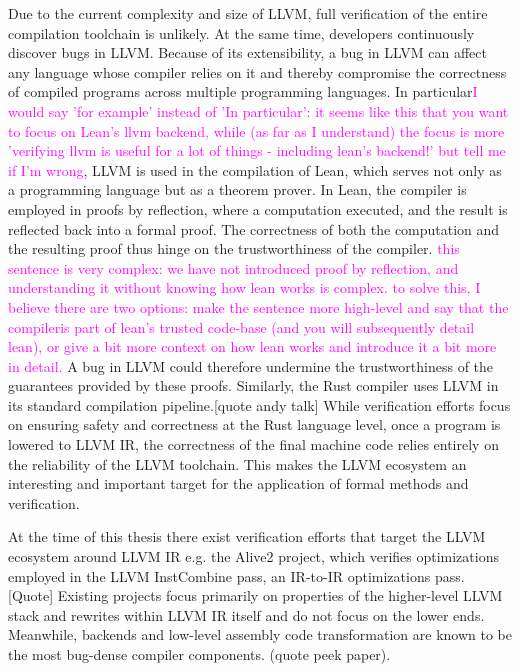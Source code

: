 Due to the current complexity and size of LLVM, full verification of the entire compilation toolchain is unlikely. At the same time, developers continuously discover bugs in LLVM. Because of its extensibility, a bug in LLVM can affect any language whose compiler relies on it and thereby compromise the correctness of compiled programs across multiple programming languages.
In particular\textcolor{magenta}{I would say 'for example' instead of 'In particular': it seems like this that you want to focus on Lean's llvm backend, while (as far as I understand) the focus is more 'verifying llvm is useful for a lot of things - including lean's backend!' but tell me if I'm wrong}, LLVM is used in the compilation of Lean, which serves not only as a programming language but  as a theorem prover. In Lean, the compiler is employed in proofs by reflection, where a computation  executed, and the result is reflected back into a formal proof. The correctness of both the computation and the resulting proof thus hinge on the trustworthiness of the compiler. \textcolor{magenta}{this sentence is very complex: we have not introduced proof by reflection, and understanding it without knowing how lean works is complex. to solve this, I believe there are two options: make the sentence more high-level and say that the compileris part of lean's trusted code-base (and you will subsequently detail lean), or give a bit more context on how lean works and introduce it a bit more in detail.} A bug in LLVM could therefore undermine the trustworthiness of the guarantees provided by these proofs. Similarly, the Rust compiler uses LLVM in its standard compilation pipeline.[quote andy talk] While verification efforts focus on ensuring safety and correctness at the Rust language level, once a program is lowered to LLVM IR, the correctness of the final machine code relies entirely on the reliability of the LLVM toolchain. This makes the LLVM ecosystem an interesting and important target for the application of formal methods and verification.


At the time of this thesis there exist verification efforts that target the LLVM ecosystem around LLVM IR e.g. the Alive2 project, which verifies optimizations employed in the LLVM InstCombine pass, an IR-to-IR optimizations pass. [Quote]
Existing projects focus primarily on properties of the higher-level LLVM stack and rewrites within LLVM IR itself and do not focus on the lower ends. Meanwhile, backends and low-level assembly code transformation are known to be the most bug-dense compiler components. (quote peek paper). 

